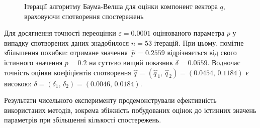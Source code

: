 \begin{figure}[H]\centering
    \setfontsize{14pt}
    \caption{Ітерації алгоритму Баума-Велша для оцінки компонент вектора $q$, враховуючи спотворення спостережень}
    \label{pic: q distortion baum-welch learning algorithm}
\end{figure}

\newpage
Для досягнення точності переоцінки $\varepsilon=0.0001$ оцінюваного параметра $p$ у випадку спотворених даних знадобилося $n=53$ ітерацій. При цьому, помітне збільшення похибки: отримане значення $\widehat{\,p\,}=0.2559$ відрізняється від свого істинного значення $p=0.2$ на суттєво вищий показник $\delta=0.0559$. Водночас точність оцінки коефіцієнтів спотворення $\widehat{q\,} = \left( \widehat{q\,}_1,\,\widehat{q\,}_2 \right) = (0.0454,\,0.1184)$ є високою: $\delta=(\delta_1,\,\delta_2)=(0.0046,\,0.0184)$.

\chapconclude{\ref{chap: practice}}

Результати чисельного експерименту продемонстрували ефективність використаних методів, зокрема збіжність побудованих оцінок до істинних значень параметрів при збільшенні кількості спостережень.